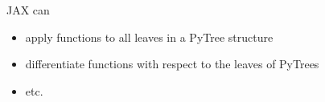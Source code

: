\begin{frame}
    
    
    \resizebox{0.9\textwidth}{!}{
        
    }

\end{frame}


\begin{frame}
    
    JAX can

    \begin{itemize}
        \item apply functions to all leaves in a PyTree structure
        \vspace{0.5em}
        \item differentiate functions with respect to the leaves of PyTrees
        \vspace{0.5em}
        \item etc.
    \end{itemize}


\end{frame}

